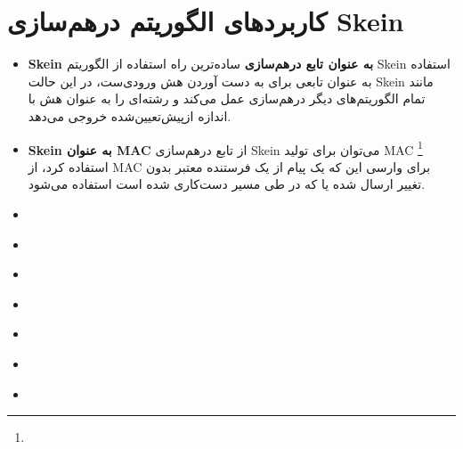 \section{کاربردهای الگوریتم درهم‌سازی Skein}
\begin{itemize}
	
	\item \textbf{Skein به عنوان تابع درهم‌سازی}
	      ساده‌ترین راه استفاده از الگوریتم Skein استفاده به عنوان تابعی برای به دست آوردن هش ورودی‌ست، در این حالت Skein مانند تمام الگوریتم‌های دیگر درهم‌سازی عمل می‌کند و رشته‌ای را به عنوان هش با اندازه ازپیش‌تعیین‌شده خروجی می‌دهد.
	\item \textbf{Skein به عنوان MAC}
	      از تابع درهم‌سازی Skein می‌توان برای تولید MAC
	      \footnote{}
	      استفاده کرد، از 
	      MAC 
	      برای وارسی این که یک پیام از یک فرستنده معتبر بدون تغییر ارسال شده یا که در طی مسیر دست‌کاری شده است استفاده می‌شود. 
	\item {}
	\item \textbf{}
	\item \textbf{}
	\item \textbf{}
	\item \textbf{}
	\item \textbf{}
	\item \textbf{}
\end{itemize}
\begin{thebibliography}{1}
	
	
	  
	
	  
	
	
\end{thebibliography}